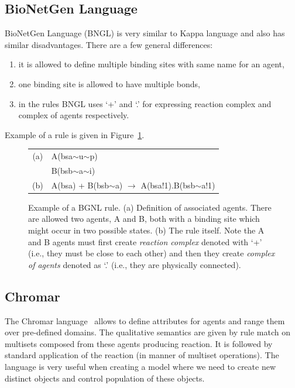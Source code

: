 \documentclass[12pt]{fithesis2}
\begin{document}
\subsection{BioNetGen Language}
\label{bngl}

BioNetGen Language (BNGL) \cite{BNGL} is very similar to Kappa language and also has similar disadvantages. There are a few general differences: 

\begin{enumerate}
	\item it is allowed to define multiple binding sites with same name for an agent,
	\item one binding site is allowed to have multiple bonds,
	\item in the rules BNGL uses `+' and `.' for expressing reaction complex and complex of agents respectively.
\end{enumerate}

Example of a rule is given in Figure~\ref{bngl-rule}.

\begin{figure}[!h]
\begin{center}
\begin{tabular}{c l}
(a) & A(bsa$\sim$u$\sim$p) \\
  & B(bsb$\sim$a$\sim$i) \\
(b) & A(bsa) + B(bsb$\sim$a) $\rightarrow$ A(bsa!1).B(bsb$\sim$a!1) \\
\end{tabular}
\end{center}
\caption{Example of a BGNL rule. (a) Definition of associated agents. There are allowed two agents, A and B, both with a binding site which might occur in two possible states. (b) The rule itself. Note the A and B agents must first create \emph{reaction complex} denoted with `+' (i.e., they must be close to each other) and then they create \emph{complex of agents} denoted as `.' (i.e., they are physically connected).}\label{bngl-rule}
\end{figure}

\subsection{Chromar}

The Chromar language~\cite{honorato2017chromar} allows to define attributes for agents and range them over pre-defined domains. The qualitative semantics are given by rule match on multisets composed from these agents producing reaction. It is followed by standard application of the reaction (in manner of multiset operations). The language is very useful when creating a model where we need to create new distinct objects and control population of these objects.
\end{document}
